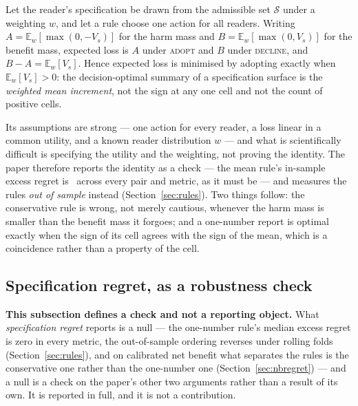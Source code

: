 \begin{lemma}
\label{prop:optimal}
Let the reader's specification be drawn from the admissible set $\mathcal{S}$
under a weighting $w$, and let a rule choose one action for all readers.
Writing $A = \mathbb{E}_w[\max(0,-V_s)]$ for the harm mass and
$B = \mathbb{E}_w[\max(0,V_s)]$ for the benefit mass, expected loss is $A$
under \textnormal{\textsc{adopt}} and $B$ under \textnormal{\textsc{decline}}, and
$B - A = \mathbb{E}_w[V_s]$. Hence expected loss is minimised by adopting
exactly when $\mathbb{E}_w[V_s] > 0$: the decision-optimal summary of a
specification surface is the \emph{weighted mean increment}, not the sign at
any one cell and not the count of positive cells.
\end{lemma}

\noindent Its assumptions are strong --- one action for every reader, a loss
linear in a common utility, and a known reader distribution $w$ --- and what
is scientifically difficult is specifying the utility and the weighting, not
proving the identity. The paper therefore reports the identity as a check ---
the mean rule's in-sample excess regret is \identityMaxExcess\ across every
pair and metric, as it must be --- and measures the rules \emph{out of
sample} instead (Section~\ref{sec:rules}). Two things follow: the conservative
rule is wrong, not merely cautious, whenever the harm mass is smaller than the
benefit mass it forgoes; and a one-number report is optimal exactly when the
sign of its cell agrees with the sign of the mean, which is a coincidence
rather than a property of the cell.

\subsection{Specification regret, as a robustness check}
\label{sec:regretdef}

\textbf{This subsection defines a check and not a reporting object.} What
\emph{specification regret} reports is a null --- the one-number rule's median
excess regret is zero in every metric, the out-of-sample ordering reverses
under rolling folds (Section~\ref{sec:rules}), and on calibrated net benefit
what separates the rules is the conservative one rather than the one-number
one (Section~\ref{sec:nbregret}) --- and a null is a check on
the paper's other two arguments rather than a result of its own. It is
reported in full, and it is not a contribution.

